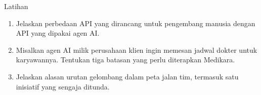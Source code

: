 \documentclass[aspectratio=169, table, 12pt]{beamer}
\begin{document}
\begin{frame}{{\Large Latihan}}
  \vspace{6pt}
  \begin{enumerate}
    \item Jelaskan perbedaan API yang dirancang untuk pengembang manusia dengan API yang dipakai agen AI.
    \item Misalkan agen AI milik perusahaan klien ingin memesan jadwal dokter untuk karyawannya. Tentukan tiga batasan yang perlu diterapkan Medikara.
    \item Jelaskan alasan urutan gelombang dalam peta jalan tim, termasuk satu inisiatif yang sengaja ditunda.
  \end{enumerate}
\end{frame}
\end{document}
